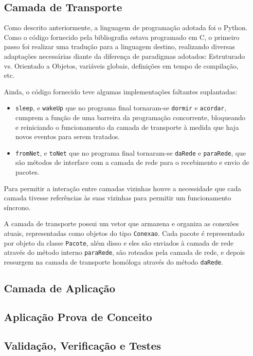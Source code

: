 \documentclass[brazil,times,12pt]{abnt}
\begin{document}
\subsection*{Camada de Transporte}
	Como descrito anteriormente, a linguagem de programação adotada foi o Python.
	Como o código fornecido pela bibliografia estava programado em C, o primeiro
	passo foi realizar uma tradução para a linguagem destino, realizando diversas
	adaptações necessárias diante da diferença de paradigmas adotados: Estruturado
	vs. Orientado a Objetos, variáveis globais, definições em tempo de compilação,
	etc.
	
	Ainda, o código fornecido teve algumas implementações faltantes suplantadas:
	
	\begin{itemize}
  		\item \texttt{sleep}, e \texttt{wakeUp} que no programa final tornaram-se
  		\texttt{dormir} e \texttt{acordar}, cumprem a função de uma barreira da
  		programação concorrente, bloqueando e reiniciando o funcionamento da camada
  		de transporte à medida que haja novos eventos para serem tratados.
  		\item \texttt{fromNet}, e \texttt{toNet} que no programa final tornaram-se
  		\texttt{daRede} e \texttt{paraRede}, que são métodos de interface com a
  		camada de rede para o recebimento e envio de pacotes.
	\end{itemize}
	
	Para permitir a interação entre camadas vizinhas houve a necessidade que cada
	camada tivesse referências às suas vizinhas para permitir um funcionamento
	síncrono.
	
	A camada de transporte possui um vetor que armazena e organiza as conexões
	atuais, representadas como objetos do tipo \texttt{Conexao}. Cada pacote é
	representado por objeto da classe \texttt{Pacote}, além disso e eles são
	enviados à camada de rede através do método interno \texttt{paraRede}, são
	roteados pela camada de rede, e depois ressurgem na camada de transporte
	homóloga através do método \texttt{daRede}.


\subsection*{Camada de Aplicação}
\subsection*{Aplicação Prova de Conceito}
\subsection*{Validação, Verificação e Testes}
\end{document}
